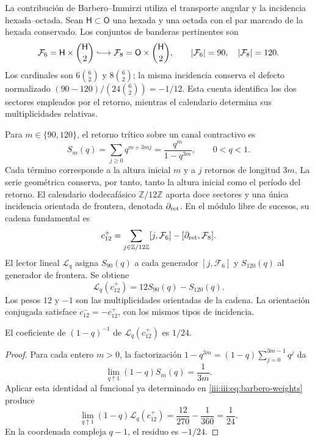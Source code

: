La contribución de Barbero--Immirzi utiliza el transporte angular y la
incidencia hexada--octada. Sean $\mathsf H\subset\mathsf O$ una hexada
y una octada con el par marcado de la hexada conservado. Los conjuntos de
banderas pertinentes son
\begin{equation}
 \mathcal F_6=\mathsf H\times\binom{\mathsf H}{2}
 \lhook\joinrel\longrightarrow
 \mathcal F_8=\mathsf O\times\binom{\mathsf H}{2},
 \qquad |\mathcal F_6|=90,\quad |\mathcal F_8|=120.
 \label{iii:iii:eq:barbero-flags}
\end{equation}
Los cardinales son $6\binom62$ y $8\binom62$; la misma incidencia
conserva el defecto normalizado
$(90-120)/(24\binom62)=-1/12$. Esta cuenta identifica los dos sectores
empleados por el retorno, mientras el calendario determina sus
multiplicidades relativas.

Para $m\in\{90,120\}$, el retorno trítico sobre un canal contractivo es
\begin{equation}
 S_m(q)=\sum_{j\geq0}q^{m+3mj}
       =\frac{q^m}{1-q^{3m}},\qquad 0<q<1.
 \label{iii:iii:eq:barbero-return-series}
\end{equation}
Cada término corresponde a la altura inicial $m$ y a $j$ retornos de
longitud $3m$. La serie geométrica conserva, por tanto, tanto la altura
inicial como el período del retorno. El calendario dodecafásico
$\mathbb Z/12\mathbb Z$ aporta doce sectores y una única incidencia
orientada de frontera, denotada $\partial_{\rm ret}$. En el módulo
libre de sucesos, su cadena fundamental es
\begin{equation}
 c_{12}^{+}
 =\sum_{j\in\mathbb Z/12\mathbb Z}[j,\mathcal F_6]
  -[\partial_{\rm ret},\mathcal F_8].
 \label{iii:iii:eq:barbero-cycle}
\end{equation}
El lector lineal $\mathscr L_q$ asigna $S_{90}(q)$ a cada generador
$[j,\mathcal F_6]$ y $S_{120}(q)$ al generador de frontera. Se obtiene
\begin{equation}
 \mathscr L_q(c_{12}^{+})=12S_{90}(q)-S_{120}(q).
 \label{iii:iii:eq:barbero-weights}
\end{equation}
Los pesos $12$ y $-1$ son las multiplicidades orientadas de la cadena.
La orientación conjugada satisface $c_{12}^{-}=-c_{12}^{+}$, con los
mismos tipos de incidencia.

\begin{proposition}
\label{iii:iii:prop:barbero-pole}
El coeficiente de $(1-q)^{-1}$ de
$\mathscr L_q(c_{12}^{+})$ es $1/24$.
\end{proposition}
\begin{proof}
Para cada entero $m>0$, la factorización
$1-q^{3m}=(1-q)\sum_{j=0}^{3m-1}q^j$ da
\[
 \lim_{q\uparrow1}(1-q)S_m(q)=\frac1{3m}.
\]
Aplicar esta identidad al funcional ya determinado en
\eqref{iii:iii:eq:barbero-weights} produce
\begin{equation}
 \lim_{q\uparrow1}(1-q)\mathscr L_q(c_{12}^{+})
 =\frac{12}{270}-\frac1{360}=\frac1{24}.
 \label{iii:iii:eq:barbero-pole}
\end{equation}
En la coordenada compleja $q-1$, el residuo es $-1/24$.
\end{proof}

